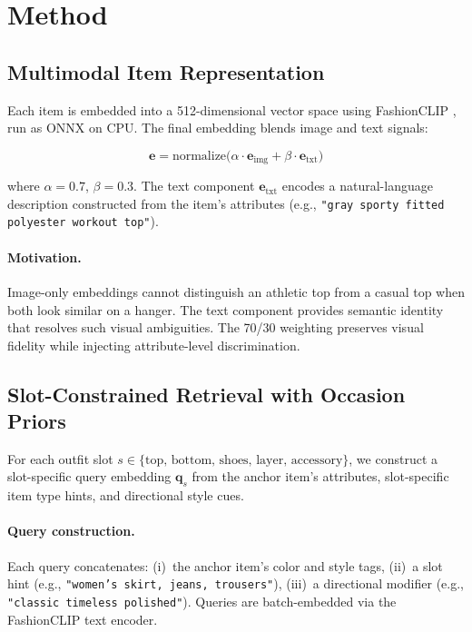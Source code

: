 \documentclass[10pt,twocolumn]{article}
\begin{document}
\section{Method}
\label{sec:method}

\subsection{Multimodal Item Representation}
\label{sec:embedding}

Each item is embedded into a 512-dimensional vector space using FashionCLIP
\citep{chia2022fashionclip}, run as ONNX on CPU.  The final embedding
blends image and text signals:

\begin{equation}
  \mathbf{e} = \text{normalize}\big(
    \alpha \cdot \mathbf{e}_{\text{img}} + \beta \cdot \mathbf{e}_{\text{txt}}
  \big)
\label{eq:blend}
\end{equation}

\noindent where $\alpha = 0.7$, $\beta = 0.3$.  The text component
$\mathbf{e}_{\text{txt}}$ encodes a natural-language description constructed
from the item's attributes (e.g., \texttt{"gray sporty fitted polyester
workout top"}).

\paragraph{Motivation.}
Image-only embeddings cannot distinguish an athletic top from a casual top
when both look similar on a hanger.  The text component provides semantic
identity that resolves such visual ambiguities.  The 70/30 weighting
preserves visual fidelity while injecting attribute-level discrimination.

\subsection{Slot-Constrained Retrieval with Occasion Priors}
\label{sec:retrieval}

For each outfit slot $s \in \{\text{top, bottom, shoes, layer,}$
$\text{accessory}\}$, we construct a slot-specific query embedding
$\mathbf{q}_s$ from the anchor item's attributes, slot-specific item
type hints, and directional style cues.

\paragraph{Query construction.}
Each query concatenates: (i)~the anchor item's color and style tags,
(ii)~a slot hint (e.g., \texttt{"women's skirt, jeans, trousers"}), (iii)~a
directional modifier (e.g., \texttt{"classic timeless polished"}).  Queries
are batch-embedded via the FashionCLIP text encoder.
\end{document}
